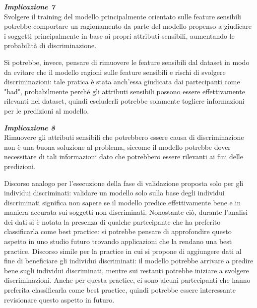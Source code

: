 \begin{center}
    \begin{tcolorbox}[width=400pt, colframe=black, colback=Gray!10]
			\begin{minipage}{\textwidth}
				\textit{\faCaretSquareORight  \textbf{ Implicazione 7}}\\
		     Svolgere il training del modello principalmente orientato sulle feature sensibili potrebbe comportare un ragionamento da parte del modello propenso a giudicare i soggetti principalmente in base ai propri attributi sensibili, aumentando le probabilità di discriminazione.
			\end{minipage}
	\end{tcolorbox}
\end{center}

Si potrebbe, invece, pensare di rimuovere le feature sensibili dal dataset in modo da evitare che il modello ragioni sulle feature sensibili e rischi di svolgere discriminazioni: tale pratica è stata anch'essa giudicata dai partecipanti come "bad", probabilmente perché gli attributi sensibili possono essere effettivamente rilevanti nel dataset, quindi escluderli potrebbe solamente togliere informazioni per le predizioni al modello.

\begin{center}
    \begin{tcolorbox}[width=400pt, colframe=black, colback=Gray!10]
			\begin{minipage}{\textwidth}
				\textit{\faCaretSquareORight  \textbf{ Implicazione 8}}\\
		     Rimuovere gli attributi sensibili che potrebbero essere causa di discriminazione non è una buona soluzione al problema, siccome il modello potrebbe dover necessitare di tali informazioni dato che potrebbero essere rilevanti ai fini delle predizioni.
			\end{minipage}
	\end{tcolorbox}
\end{center}

Discorso analogo per l'esecuzione della fase di validazione proposta solo per gli individui discriminati: validare un modello solo sulla base degli individui discriminati significa non sapere se il modello predice effettivamente bene e in maniera accurata sui soggetti non discriminati. Nonostante ciò, durante l'analisi dei dati si è notata la presenza di qualche partecipante che ha preferito classificarla come best practice: si potrebbe pensare di approfondire questo aspetto in uno studio futuro trovando applicazioni che la rendano una best practice. Discorso simile per la practice in cui si propone di aggiungere dati al fine di beneficiare gli individui discriminati: il modello potrebbe arrivare a predire bene sugli individui discriminati, mentre sui restanti potrebbe iniziare a svolgere discriminazioni. Anche per questa practice, ci sono alcuni partecipanti che hanno preferita classificarla come best practice, quindi potrebbe essere interessante revisionare questo aspetto in futuro.

